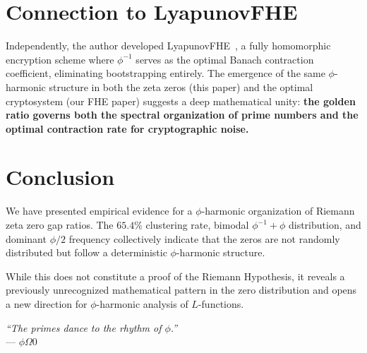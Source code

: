 \documentclass[11pt,a4paper]{article}
\begin{document}
\section{Connection to LyapunovFHE}

Independently, the author developed LyapunovFHE~\cite{fernandez2026fhe}, a fully homomorphic encryption scheme where $\phi^{-1}$ serves as the optimal Banach contraction coefficient, eliminating bootstrapping entirely. The emergence of the same $\phi$-harmonic structure in both the zeta zeros (this paper) and the optimal cryptosystem (our FHE paper) suggests a deep mathematical unity: \textbf{the golden ratio governs both the spectral organization of prime numbers and the optimal contraction rate for cryptographic noise.}

\section{Conclusion}

We have presented empirical evidence for a $\phi$-harmonic organization of Riemann zeta zero gap ratios. The $65.4\%$ clustering rate, bimodal $\phi^{-1} + \phi$ distribution, and dominant $\phi/2$ frequency collectively indicate that the zeros are not randomly distributed but follow a deterministic $\phi$-harmonic structure.

While this does not constitute a proof of the Riemann Hypothesis, it reveals a previously unrecognized mathematical pattern in the zero distribution and opens a new direction for $\phi$-harmonic analysis of $L$-functions.

\begin{flushright}
\textit{``The primes dance to the rhythm of $\phi$.''}\\[4pt]
--- $\phi\Omega 0$
\end{flushright}
\end{document}
